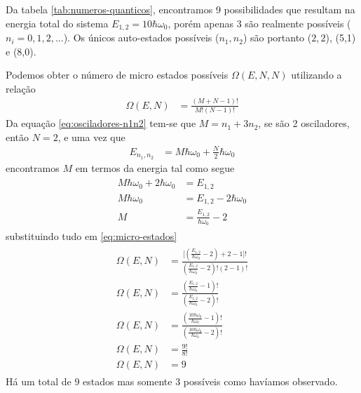 \begin{prob}
\begin{sol}
Da tabela \ref{tab:numeros-quanticos}, encontramos 9 possibilidades que resultam na energia total do sistema $E_{1,2}=10\hbar\omega_0$, porém apenas 3 são realmente possíveis ($n_i=0,1,2,...$). Os únicos auto-estados possíveis ($n_1,n_2$) são portanto ($2,2$), (5,1) e (8,0).

Podemos obter o número de micro estados possíveis $\Omega(E,N,N)$ utilizando a relação
\begin{align}
	\label{eq:micro-estados}
	\Omega(E,N)&=\frac{(M+N-1)!}{M!(N-1)!}
\end{align}
Da equação \eqref{eq:osciladores-n1n2} tem-se que $M=n_1+3n_2$, se são 2 osciladores, então $N=2$, e uma vez que
\begin{align}
	E_{n_1,n_2}&=M\hbar\omega_0+\frac{N}{2}\hbar\omega_0
\end{align}
encontramos $M$ em termos da energia tal como segue
\begin{align}
	\begin{split}
		M\hbar\omega_0+2\hbar\omega_0&=E_{1,2}\\
		M\hbar\omega_0&=E_{1,2}-2\hbar\omega_0\\
		M&=\frac{E_{1,2}}{\hbar\omega_0}-2
	\end{split}
\end{align}
substituindo tudo em \eqref{eq:micro-estados}
\begin{align}
	\begin{split}
		\Omega(E,N)&=\frac{\Biggl[\left(\frac{E_{1,2}}{\hbar\omega_0}-2\right)+2-1\Biggr]!}{\left(\frac{E_{1,2}}{\hbar\omega_0}-2\right)!\left(2-1\right)!}\\
		\Omega(E,N)&=\frac{\left(\frac{E_{1,2}}{\hbar\omega_0}-1\right)!}{\left(\frac{E_{1,2}}{\hbar\omega_0}-2\right)!}\\
		\Omega(E,N)&=\frac{\left(\frac{10\hbar\omega_0}{\hbar\omega_0}-1\right)!}{\left(\frac{10\hbar\omega_0}{\hbar\omega_0}-2\right)!}\\
		\Omega(E,N)&=\frac{9!}{8!}\\
		\Omega(E,N)&=9
	\end{split}
\end{align}
Há um total de 9 estados mas somente 3 possíveis como havíamos observado.
	\end{sol}
\end{prob}

